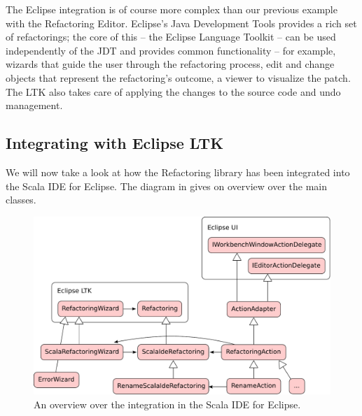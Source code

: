 \documentclass[10pt,a4paper,oneside]{scrreprt}
\begin{document}
The Eclipse integration is of course more complex than our previous example with the Refactoring Editor. Eclipse's Java Development Tools provides a rich set of refactorings; the core of this -- the Eclipse Language Toolkit \cite{LTK} -- can be used independently of the JDT and provides common functionality -- for example, wizards that guide the user through the refactoring process, edit and change objects that represent the refactoring's outcome, a viewer to visualize the patch. The LTK also takes care of applying the changes to the source code and undo management. 

\subsection{Integrating with Eclipse LTK}

We will now take a look at how the Refactoring library has been integrated into the Scala IDE for Eclipse. The diagram in  gives on overview over the main classes. 

\begin{figure}
  \centering
  \includegraphics[width=\linewidth]{eclipse-integration.pdf}
  \caption{An overview over the integration in the Scala IDE for Eclipse. }
  \label{figure:eclipse-integration}
\end{figure}
\end{document}
